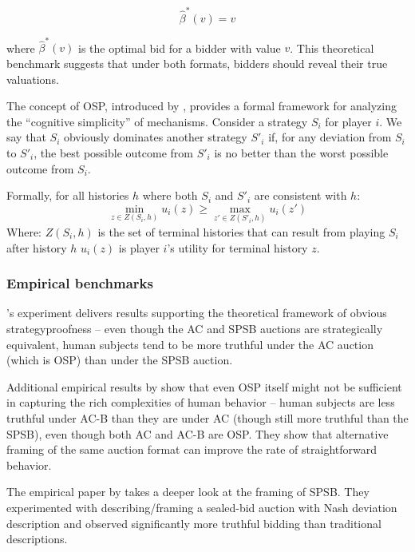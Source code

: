 \documentclass{article} %
\begin{document}
\begin{equation}
    \hat{\beta}^*(v) = v
\end{equation}

where $\hat{\beta}^*(v)$ is the optimal bid for a bidder with value $v$. This theoretical benchmark suggests that under both formats, bidders should reveal their true valuations.

 The concept of OSP, introduced by \cite{li2017obviously}, provides a formal framework for analyzing the ``cognitive simplicity'' of mechanisms.
Consider a strategy $S_i$ for player $i$. 
We say that $S_i$ obviously dominates another strategy $S'_i$ if, for any deviation from $S_i$ to $S'_i$, the best possible outcome from $S'_i$ is no better than the worst possible outcome from $S_i$.

Formally, for all histories $h$ where both $S_i$ and $S'_i$ are consistent with $h$:
\begin{equation}
\min_{z \in Z(S_i, h)} u_i(z) \geq \max_{z' \in Z(S'_i, h)} u_i(z')
\end{equation}
Where: $Z(S_i, h)$ is the set of terminal histories that can result from playing $S_i$ after history $h$
$u_i(z)$ is player $i$'s utility for terminal history $z$. 

\subsubsection{Empirical benchmarks}

\citet{li2017obviously}'s experiment delivers results supporting the theoretical framework of obvious strategyproofness -- even though the AC and SPSB auctions are strategically equivalent, human subjects tend to be more truthful under the AC auction (which is OSP) than under the SPSB auction. 

Additional empirical results by \citet{breitmoser2022obviousness} show that even OSP itself might not be sufficient in capturing the rich complexities of human behavior -- human subjects are less truthful under AC-B than they are under AC (though still more truthful than the SPSB), even though both AC and AC-B are OSP.  
They show that alternative framing of the same auction format can improve the rate of straightforward behavior.

 The empirical paper by \cite{gonczarowski2023strategyproofness} takes a
deeper look at the framing of SPSB. 
They experimented with describing/framing a sealed-bid auction with Nash deviation description
and observed significantly more truthful bidding than traditional descriptions.
\end{document}
